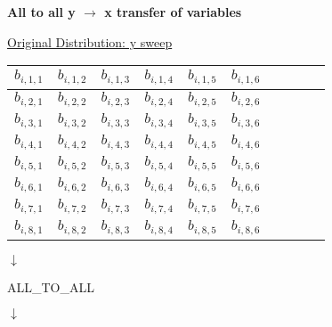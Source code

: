 \documentclass[11pt,doublespace]{article}
\begin{document}
\begin{center}
{\Large {\bf All to all y $\rightarrow$ x transfer of variables} }
\end{center}
\bigskip

\centerline{\underline{Original Distribution: y sweep}}
\medskip
\begin{center}
\begin{tabular}{|c|c|c||c|c|c|c|c|c|c|} 
\hline
$ b_{i,1,1}$ & $b_{i,1,2}$ & $b_{i,1,3}$ & $b_{i,1,4}$ & $b_{i,1,5}$ & $b_{i,1,6}$ \\
\hline
$ b_{i,2,1}$ & $b_{i,2,2}$ & $b_{i,2,3}$ & $b_{i,2,4}$ & $b_{i,2,5}$ & $b_{i,2,6}$ \\
\hline
$ b_{i,3,1}$ & $b_{i,3,2}$ & $b_{i,3,3}$ & $b_{i,3,4}$ & $b_{i,3,5}$ & $b_{i,3,6}$ \\
\hline
$ b_{i,4,1}$ & $b_{i,4,2}$ & $b_{i,4,3}$ & $b_{i,4,4}$ & $b_{i,4,5}$ & $b_{i,4,6}$ \\
\hline\hline\hline
$ b_{i,5,1}$ & $b_{i,5,2}$ & $b_{i,5,3}$ & $b_{i,5,4}$ & $b_{i,5,5}$ & $b_{i,5,6}$ \\
\hline
$ b_{i,6,1}$ & $b_{i,6,2}$ & $b_{i,6,3}$ & $b_{i,6,4}$ & $b_{i,6,5}$ & $b_{i,6,6}$\\
\hline
$ b_{i,7,1}$ & $b_{i,7,2}$ & $b_{i,7,3}$ & $b_{i,7,4}$ & $b_{i,7,5}$ & $b_{i,7,6}$\\
\hline
$ b_{i,8,1}$ & $b_{i,8,2}$ & $b_{i,8,3}$ & $b_{i,8,4}$ & $b_{i,8,5}$ & $b_{i,8,6}$\\
\hline
\end{tabular}
\end{center}

\begin{center}
$\downarrow$
\end{center}

\begin{center}
{\Large ALL\_TO\_ALL }
\end{center}

\begin{center}
$\downarrow$
\end{center}
\end{document}
